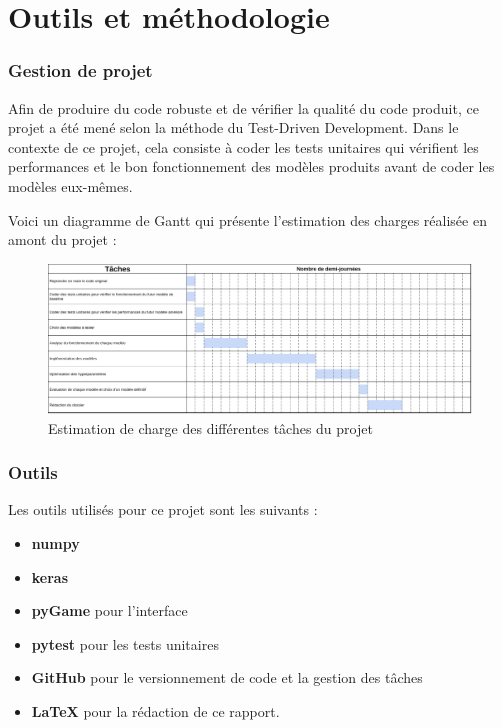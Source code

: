 \documentclass[french]{article}
\begin{document}
    \section{Outils et méthodologie}
    \subsubsection{Gestion de projet}

    Afin de produire du code robuste et de vérifier la qualité du code produit, ce projet a été mené selon la méthode du Test-Driven Development. Dans le contexte de ce projet, cela consiste à coder les tests unitaires qui vérifient les performances et le bon fonctionnement des modèles produits avant de coder les modèles eux-mêmes.
    
    Voici un diagramme de Gantt qui présente l'estimation des charges réalisée en amont du projet :

    \begin{figure}[h]
        \includegraphics[width=13cm]{gantt}
        \centering
        \caption{Estimation de charge des différentes tâches du projet}
        \centering
    \end{figure}

    \subsubsection{Outils}

    Les outils utilisés pour ce projet sont les suivants :
    \begin{itemize}
        \item \textbf{numpy}
        \item \textbf{keras}
        \item \textbf{pyGame} pour l'interface
        \item \textbf{pytest} pour les tests unitaires
        \item \textbf{GitHub} pour le versionnement de code et la gestion des tâches
        \item \textbf{\LaTeX} pour la rédaction de ce rapport.
    \end{itemize}
\end{document}
